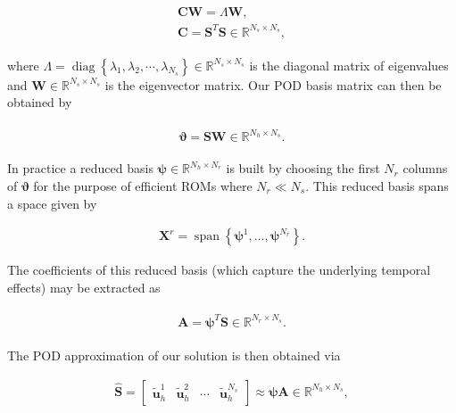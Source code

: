 \documentclass[preprint,12pt]{elsarticle}
\begin{document}
\begin{linenomath*}
\begin{align}
\begin{gathered}
\mathbf{C} \mathbf{W} = \Lambda \mathbf{W}, \\
\mathbf{C} = \mathbf{S}^T \mathbf{S} \in \mathbb{R}^{N_s \times N_s},
\end{gathered}
\end{align}
\end{linenomath*}
where $\Lambda = \operatorname{diag}\left\{\lambda_{1}, \lambda_{2}, \cdots, \lambda_{N_{s}}\right\} \in \mathbb{R}^{N_{s} \times N_{s}}$ is the diagonal matrix of eigenvalues and $\mathbf{W} \in \mathbb{R}^{N_{s} \times N_{s}}$ is the eigenvector matrix. Our POD basis matrix can then be obtained by
\begin{linenomath*}
\begin{align}
\begin{gathered}
\boldsymbol{\vartheta} = \mathbf{S} \mathbf{W} \in \mathbb{R}^{N_h \times N_s}.
\end{gathered}
\end{align}
\end{linenomath*}
In practice a reduced basis $\boldsymbol{\psi} \in \mathbb{R}^{N_h \times N_r}$ is built by choosing the first $N_r$ columns of $\boldsymbol{\vartheta}$ for the purpose of efficient ROMs where $N_r \ll N_s$. This reduced basis spans a space given by
\begin{linenomath*}
\begin{align}
\mathbf{X}^{r}=\operatorname{span}\left\{\boldsymbol{\psi}^{1}, \dots, \boldsymbol{\psi}^{N_r}\right\}.
\end{align}
\end{linenomath*}
The coefficients of this reduced basis (which capture the underlying temporal effects) may be extracted as
\begin{linenomath*}
\begin{align}
\begin{gathered}
\mathbf{A} = \boldsymbol{\psi}^{T} \mathbf{S} \in \mathbb{R}^{N_r \times N_s}.
\end{gathered}
\end{align}
\end{linenomath*}
The POD approximation of our solution is then obtained via
\begin{linenomath*}
\begin{align}
\hat{\mathbf{S}} =  [\begin{array}{c|c|c|c}{\tilde{\mathbf{u}}^{1}_h} & {\tilde{\mathbf{u}}^{2}_h} & {\cdots} & {\tilde{\mathbf{u}}^{N_{s}}_h}\end{array}] \approx \boldsymbol{\psi} \mathbf{A} \in \mathbb{R}^{N_h \times N_s},
\end{align}
\end{linenomath*}
\end{document}
